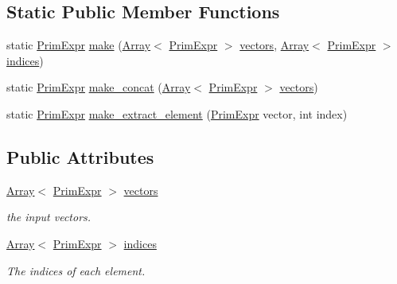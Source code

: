 \subsection*{Static Public Member Functions}
\begin{DoxyCompactItemize}
\item 
static \hyperlink{classtvm_1_1PrimExpr}{Prim\+Expr} \hyperlink{classtvm_1_1tir_1_1ShuffleNode_a7e8f0acfc91e59f25d5c054576a95c85}{make} (\hyperlink{classtvm_1_1Array}{Array}$<$ \hyperlink{classtvm_1_1PrimExpr}{Prim\+Expr} $>$ \hyperlink{classtvm_1_1tir_1_1ShuffleNode_aa444b61cf671ef31060535c61746ab6c}{vectors}, \hyperlink{classtvm_1_1Array}{Array}$<$ \hyperlink{classtvm_1_1PrimExpr}{Prim\+Expr} $>$ \hyperlink{classtvm_1_1tir_1_1ShuffleNode_a3e4a328452a531b67642117f023e8a0e}{indices})
\item 
static \hyperlink{classtvm_1_1PrimExpr}{Prim\+Expr} \hyperlink{classtvm_1_1tir_1_1ShuffleNode_aff50804874dfea17238bfcb84660fe4b}{make\+\_\+concat} (\hyperlink{classtvm_1_1Array}{Array}$<$ \hyperlink{classtvm_1_1PrimExpr}{Prim\+Expr} $>$ \hyperlink{classtvm_1_1tir_1_1ShuffleNode_aa444b61cf671ef31060535c61746ab6c}{vectors})
\item 
static \hyperlink{classtvm_1_1PrimExpr}{Prim\+Expr} \hyperlink{classtvm_1_1tir_1_1ShuffleNode_ae4523770814267bf73788ef9ecaf6417}{make\+\_\+extract\+\_\+element} (\hyperlink{classtvm_1_1PrimExpr}{Prim\+Expr} vector, int index)
\end{DoxyCompactItemize}
\subsection*{Public Attributes}
\begin{DoxyCompactItemize}
\item 
\hyperlink{classtvm_1_1Array}{Array}$<$ \hyperlink{classtvm_1_1PrimExpr}{Prim\+Expr} $>$ \hyperlink{classtvm_1_1tir_1_1ShuffleNode_aa444b61cf671ef31060535c61746ab6c}{vectors}
\begin{DoxyCompactList}\small\item\em the input vectors. \end{DoxyCompactList}\item 
\hyperlink{classtvm_1_1Array}{Array}$<$ \hyperlink{classtvm_1_1PrimExpr}{Prim\+Expr} $>$ \hyperlink{classtvm_1_1tir_1_1ShuffleNode_a3e4a328452a531b67642117f023e8a0e}{indices}
\begin{DoxyCompactList}\small\item\em The indices of each element. \end{DoxyCompactList}\end{DoxyCompactItemize}
